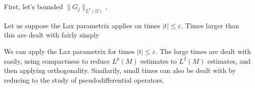 First, let's bounded $\| G_j \|_{L^2(\Omega)}$.







Let us suppose the Lax parametrix applies on times $|t| \leq \varepsilon$. Times larger than this are dealt with fairly simply

We can apply the Lax parametrix for times $|t| \leq \varepsilon$. The large times are dealt with easily, using compactness to reduce $L^p(M)$ estimates to $L^2(M)$ estimates, and then applying orthogonality. Similarily, small times can also be dealt with by reducing to the study of pseudodifferential operators.















%
%
%










